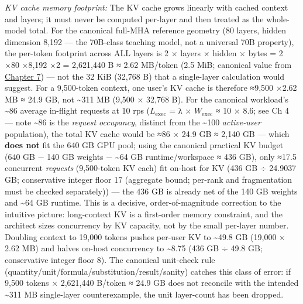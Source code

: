 \emph{KV cache memory footprint:} The KV cache grows linearly with
cached context and layers; it must never be computed per-layer and then
treated as the whole-model total. For the canonical full-MHA reference
geometry (80 layers, hidden dimension 8,192 --- the 70B-class teaching
model, not a universal 70B property), the per-token footprint across ALL
layers is 2 × layers × hidden × bytes = 2 ×80 ×8,192 ×2 = 2,621,440 B ≈
2.62 MB/token (2.5 MiB; canonical value from \hyperref[chap:7]{Chapter 7}) --- not the 32
KiB (32,768 B) that a single-layer calculation would suggest. For a
9,500-token context, one user's KV cache is therefore ≈9,500 ×2.62 MB ≈
24.9 GB, not \textasciitilde311 MB (9,500 × 32,768 B). For the canonical
workload's \textasciitilde86 average in-flight requests at 10 rps
(\(L_{\mathrm{exec}}\) = λ × \(W_{\mathrm{exec}}\) ≈ 10 × 8.6; see Ch 4
--- note \textasciitilde86 is the \emph{request occupancy}, distinct
from the \textasciitilde100 \emph{active-user} population), the total KV
cache would be ≈86 × 24.9 GB ≈ 2,140 GB --- which \textbf{does not} fit
the 640 GB GPU pool; using the canonical practical KV budget (640 GB −
140 GB weights − \textasciitilde64 GB runtime/workspace ≈ 436 GB), only
≈17.5 concurrent \emph{requests} (9,500-token KV each) fit on-host for
KV (436 GB ÷ 24.9037 GB; conservative integer floor 17 (aggregate bound;
per-rank and fragmentation must be checked separately)) --- the 436 GB
is already net of the 140 GB weights and \textasciitilde64 GB runtime.
This is a decisive, order-of-magnitude correction to the intuitive
picture: long-context KV is a first-order memory constraint, and the
architect sizes concurrency by KV capacity, not by the small per-layer
number. Doubling context to 19,000 tokens pushes per-user KV to
\textasciitilde49.8 GB (19,000 × 2.62 MB) and halves on-host concurrency
to \textasciitilde8.75 (436 GB ÷ 49.8 GB; conservative integer floor 8).
The canonical unit-check rule
(quantity/unit/formula/substitution/result/sanity) catches this class of
error: if 9,500 tokens × 2,621,440 B/token ≈ 24.9 GB does not reconcile
with the intended \textasciitilde311 MB single-layer counterexample, the
unit layer-count has been dropped.

